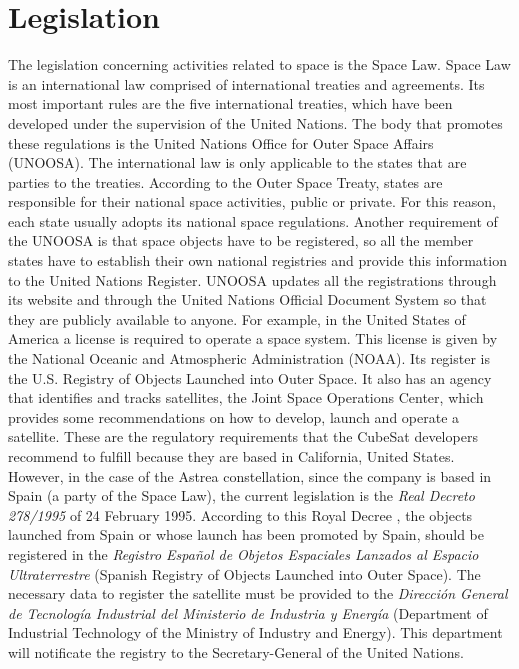 \chapter{Legislation}
The legislation concerning activities related to space is the Space Law. Space Law is an international law comprised of international treaties and agreements. Its most important rules are the five international treaties, which have been developed under the supervision of the United Nations. The body that promotes these regulations is the United Nations Office for Outer Space Affairs (UNOOSA).
\newline
\newline
The international law is only applicable to the states that are parties to the treaties. According to the Outer Space Treaty, states are responsible for their national space activities, public or private. For this reason, each state usually adopts its national space regulations.
\newline
\newline
Another requirement of the UNOOSA is that space objects have to be registered, so all the member states have to establish their own national registries and provide this information to the United Nations Register. UNOOSA updates all the registrations through its website and through the United Nations Official Document System so that they are publicly available to anyone.
For example, in the United States of America a license is required to operate a space system. This license is given by the National Oceanic and Atmospheric Administration (NOAA). Its register is the U.S. Registry of Objects Launched into Outer Space. It also has an agency that identifies and tracks satellites, the Joint Space Operations Center, which provides some recommendations on how to develop, launch and operate a satellite. These are the regulatory requirements that the CubeSat developers recommend to fulfill because they are based in California, United States.
\newline
\newline
However, in the case of the Astrea constellation, since the company is based in Spain (a party of the Space Law), the current legislation is the \textit{Real Decreto 278/1995} of 24 February 1995. According to this Royal Decree \cite{Espana.MinisteriodelaPresidencia1995}, the objects launched from Spain or whose launch has been promoted by Spain, should be registered in the \textit{Registro Español de Objetos Espaciales Lanzados al Espacio Ultraterrestre} (Spanish Registry of Objects Launched into Outer Space). The necessary data to register the satellite must be provided to the \textit{Dirección General de Tecnología Industrial del Ministerio de Industria y Energía} (Department of Industrial Technology of the Ministry of Industry and Energy). This department will notificate the registry to the Secretary-General of the United Nations.
